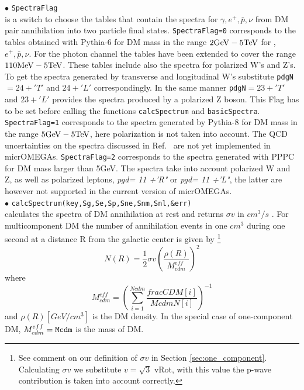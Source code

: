 \documentclass[12pt,a4paper]{article}
\begin{document}
\noindent
$\bullet$   \verb|SpectraFlag| \\
is a switch to choose the tables that contain the spectra  for $\gamma,e^+,\bar{p},\nu$ from DM pair annihilation into two particle final states. 
{\tt SpectraFlag=0} corresponds to the tables obtained with  Pythia-6 \cite{Belanger:2010gh}  for  DM mass in the range  $2{\rm  GeV} - 5{\rm TeV}$ for ,$e^+,\bar{p},\nu$. 
For the photon channel the tables  have  been extended to cover the range $110 {\rm MeV} - 5{\rm TeV}$.
These tables include also the spectra for polarized W's and Z's.
To get the spectra generated by transverse and longitudinal W's substitute 
\verb|pdgN|$=24+'T'$ and $24+'L'$ correspondingly. In the same manner \verb|pdgN|$=23+'T'$ and
$23+'L'$  provides the spectra produced by a polarized Z boson.
This Flag has to be set before calling the functions {\tt calcSpectrum} and {\tt basicSpectra}. 
{\tt SpectraFlag=1} corresponds to the spectra generated by Pythia-8 \cite{Amoroso:2018qga, Jueid:2022qjg} for DM mass in the range  $5{\rm  GeV} - 5{\rm TeV}$, here polarization is not taken into account. 
The  QCD uncertainties on the spectra discussed in Ref.~\cite{Amoroso:2018qga, Jueid:2022qjg}   are not yet implemented in  micrOMEGAs. 
{\tt SpectraFlag=2} corresponds to the 
 spectra generated with PPPC  \cite{Ciafaloni_2011,Marco_Cirelli_2011} for DM mass larger than 5GeV. The spectra take into account polarized W and Z,  as well as
polarized leptons, {\it  pgd= 11 +'R"} or {\it  pgd= 11 +'L"},  the latter are however not supported
in the current version of micrOMEGAs.\\


\noindent
$\bullet$ \verb|calcSpectrum(key,Sg,Se,Sp,Sne,Snm,Snl,&err)|\\
calculates  the spectra  of DM annihilation 
at rest and returns $\sigma v$ in $cm^3/s$ . 
For multicomponent DM the number of annihilation events in one $cm^{3}$   during one second  at a distance R from the  galactic center is given by
\footnote{ See comment on our definition of $\sigma v$ in Section \ref{sec:one_component}. Calculating $\sigma v$ we substitute $v= \sqrt{3}$ vRot, with this value the  p-wave contribution is taken into account correctly.}
\begin{equation}
      N(R)=\frac{1}{2} \sigma v \left( \frac{\rho(R)}{M_{cdm}^{eff}}\right)^2
\end{equation}
where 
\begin{equation} 
  M_{cdm}^{eff}= \left( \sum_{i=1}^{Ncdm} \frac{fracCDM[i]}{McdmN[i]}\right)^{-1}
\end{equation}  
and $\rho(R) [GeV/cm^3]$ is the DM density. In the special  case of one-component DM,  $M_{cdm}^{eff}={\tt Mcdm}$  is the mass  of DM. 
\end{document}
